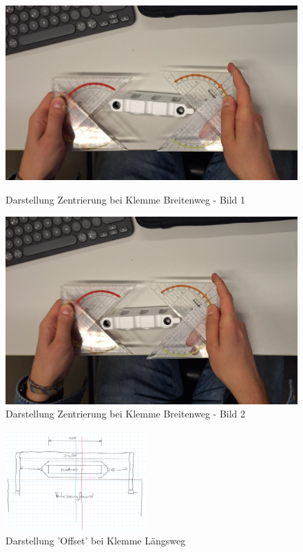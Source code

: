 \documentclass[../main.tex]{subfiles}
\begin{document}
            \begin{figure}[h!]
                \centering
                \begin{minipage}{0.48\textwidth}
                    \centering
                    \includegraphics[width=\linewidth]{img/konzeptfindung/klemme_breitenweg_zentrierung_1.jpeg}
                    \caption{Darstellung Zentrierung bei Klemme Breitenweg - Bild 1}
                    \label{img:konzept_zentrierung_1}
                \end{minipage}
                \hfill
                \begin{minipage}{0.48\textwidth}
                    \centering
                    \includegraphics[width=\linewidth]{img/konzeptfindung/klemme_breitenweg_zentrierung_2.jpeg}
                    \caption{Darstellung Zentrierung bei Klemme Breitenweg - Bild 2}
                    \label{img:konzept_zentrierung_2}
                \end{minipage}
            \end{figure}


        \begin{figure}[h!]
            \centering
            \includegraphics[width=0.48\textwidth]{img/konzeptfindung/Klemme_Langsweg_off_center.png}
            \caption{Darstellung 'Offset' bei Klemme Längsweg}
        \label{img:konzept_zentrierung_3}
        \end{figure}  
\end{document}
